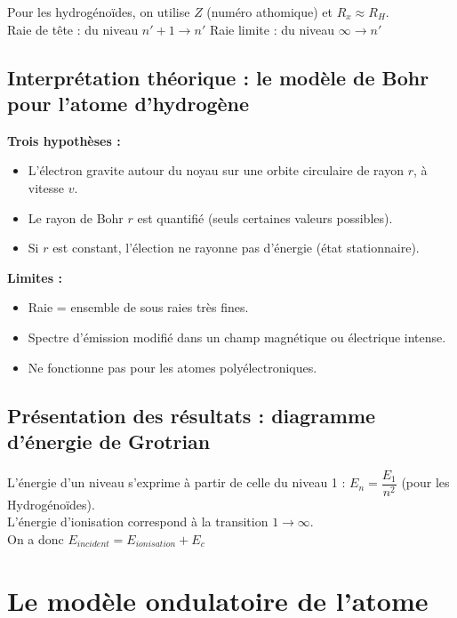 \documentclass[13pt, twoside, a4paper, french, tikz]{report}
\begin{document}
    \vspace*{10pt}
    Pour les hydrogénoïdes, on utilise $Z$ (numéro athomique) et $R_x \approx R_H$.\\

    Raie de tête : du niveau $n'+1 \rightarrow n'$ \;\;\; Raie limite : du niveau $\infty\rightarrow n'$


    \section{Interprétation théorique : le modèle de Bohr pour l'atome d'hydrogène}\label{sec:interpretation-theorique--le-modele-de-bohr-pour-latome-dhydrogene}

    \textbf{Trois hypothèses :}
    \begin{itemize}
        \item L'électron gravite autour du noyau sur une orbite circulaire de rayon $r$, à vitesse $v$.
        \item Le rayon de Bohr $r$ est quantifié (seuls certaines valeurs possibles).
        \item Si $r$ est constant, l'élection ne rayonne pas d'énergie (état stationnaire).
    \end{itemize}
    \textbf{Limites :}
    \begin{itemize}
        \item Raie = ensemble de sous raies très fines.
        \item Spectre d'émission modifié dans un champ magnétique ou électrique intense.
        \item Ne fonctionne pas pour les atomes polyélectroniques.
    \end{itemize}


    \section{Présentation des résultats : diagramme d'énergie de Grotrian}\label{sec:presentation-des-resultats--diagramme-denergie-de-grotrian}

    L'énergie d'un niveau s'exprime à partir de celle du niveau 1 : $E_n = \dfrac{E_1}{n^2}$ (pour les Hydrogénoïdes).\\
    L'énergie d'ionisation correspond à la transition $1 \rightarrow \infty$.\\
    On a donc $E_{incident} = E_{ionisation} + E_c$


    \chapter{Le modèle ondulatoire de l'atome}\label{ch:le-modele-ondulatoire-de-l'atome}
\end{document}
